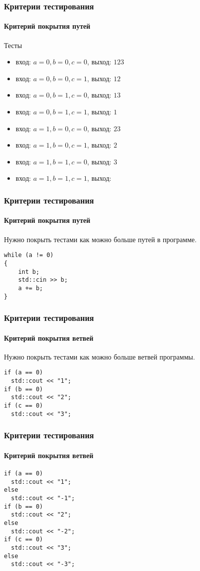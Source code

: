 \documentclass{beamer}
\begin{document}
  \begin{frame}
    \frametitle{Критерии тестирования}
    \framesubtitle{Критерий покрытия путей}
    \begin{block}{Тесты}
      \begin{itemize}[<+->]
        \item вход: $a=0, b=0, c=0$, выход: $123$
        \item вход: $a=0, b=0, c=1$, выход: $12$
        \item вход: $a=0, b=1, c=0$, выход: $13$
        \item вход: $a=0, b=1, c=1$, выход: $1$
        \item вход: $a=1, b=0, c=0$, выход: $23$
        \item вход: $a=1, b=0, c=1$, выход: $2$
        \item вход: $a=1, b=1, c=0$, выход: $3$
        \item вход: $a=1, b=1, c=1$, выход: $ $
      \end{itemize}
    \end{block}
\end{frame}

  \begin{frame}[fragile]
    \frametitle{Критерии тестирования}
    \framesubtitle{Критерий покрытия путей}
    Нужно покрыть тестами как можно больше путей в программе.
\begin{lstlisting}
while (a != 0)
{
    int b;
    std::cin >> b;
    a += b;
}
\end{lstlisting}
\end{frame}

  \begin{frame}[fragile]
    \frametitle{Критерии тестирования}
    \framesubtitle{Критерий покрытия ветвей}
    Нужно покрыть тестами как можно больше ветвей программы.
\begin{lstlisting}
if (a == 0)
  std::cout << "1";
if (b == 0)
  std::cout << "2";
if (c == 0)
  std::cout << "3";
\end{lstlisting}
\end{frame}

  \begin{frame}[fragile]
    \frametitle{Критерии тестирования}
    \framesubtitle{Критерий покрытия ветвей}
\begin{lstlisting}
if (a == 0)
  std::cout << "1";
else
  std::cout << "-1";
if (b == 0)
  std::cout << "2";
else
  std::cout << "-2";
if (c == 0)
  std::cout << "3";
else
  std::cout << "-3";
\end{lstlisting}
\end{frame}
\end{document}
